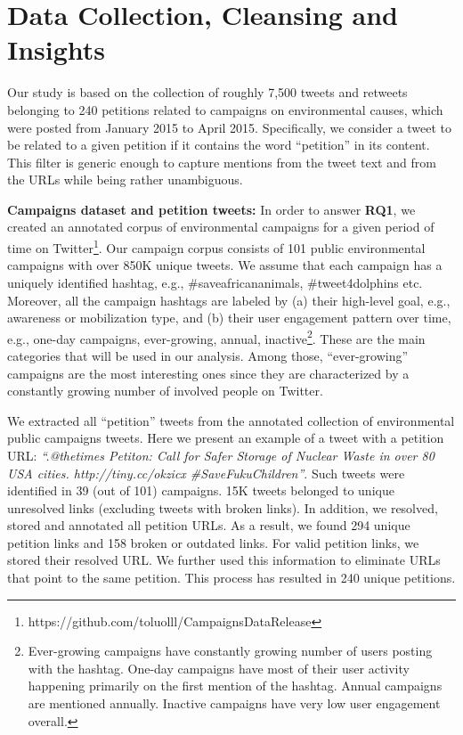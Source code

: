 \section{Data Collection, Cleansing and Insights}
\label{sec:dataset}

Our study is based on the collection of roughly 7,500 tweets and retweets belonging to 240 petitions related to campaigns on environmental causes, which were posted from January 2015 to April 2015. Specifically, we consider a tweet to be related to a given petition if it contains the word ``petition'' in its content. This filter is generic enough to capture mentions from the tweet text and from the URLs while being rather unambiguous.

\textbf{Campaigns dataset and petition tweets:}
In order to answer \textbf{RQ1},
we created an annotated corpus of environmental campaigns for a given period of time on Twitter\footnote{https://github.com/toluolll/CampaignsDataRelease}.
Our campaign corpus consists of 101 public environmental campaigns with over 850K unique tweets. 
We assume that each campaign has a uniquely identified hashtag, e.g., \#saveafricananimals, \#tweet4dolphins etc.
Moreover, all the campaign hashtags are labeled by (a) their high-level goal, e.g., awareness or mobilization type, and (b) their user engagement pattern over time, e.g., one-day campaigns, ever-growing, annual, inactive\footnote{
Ever-growing campaigns have constantly growing number of users posting with the hashtag.
One-day campaigns have most of their user activity happening primarily on the first mention of the hashtag.
Annual campaigns are mentioned annually. Inactive campaigns have very low user engagement overall.}.
These are the main categories that will be used in our analysis.
Among those, ``ever-growing'' campaigns are the most interesting ones since they are characterized by a constantly growing number of involved people on Twitter.

We extracted all ``petition'' tweets from the annotated collection of environmental public campaigns tweets.
Here we present an example of a tweet with a petition URL: \textit{``.@thetimes Petiton: Call for Safer Storage of Nuclear Waste in over 80 USA cities. http://tiny.cc/okzicx  \#SaveFukuChildren''}.
Such tweets were identified in 39 (out of 101) campaigns. 15K tweets belonged to unique unresolved links (excluding tweets with broken links).
In addition, we resolved, stored and annotated all petition URLs. As a result, we found 294 unique petition links and 158 broken or outdated links.
For valid petition links, we stored their resolved URL. We further used this information to eliminate URLs that point to the same petition.
This process has resulted in 240 unique petitions.

